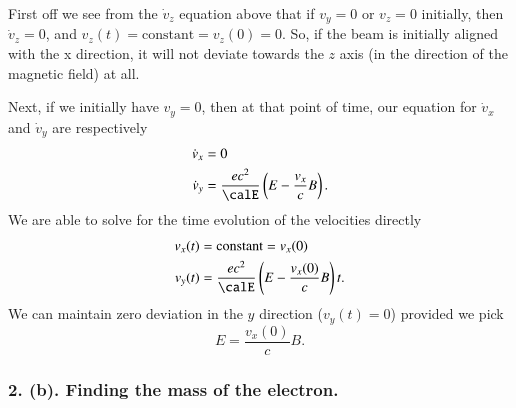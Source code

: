 {First off we see from the \(\dot{v}_z\) equation above that if \(v_y = 0\) or \(v_z = 0\) initially, then \(\dot{v}_z = 0\), and \(v_z(t) = \text{constant} = v_z(0) = 0\).  So, if the beam is initially aligned with the x direction, it will not deviate towards the \(z\) axis (in the direction of the magnetic field) at all.

Next, if we initially have \(v_y = 0\), then at that point of time, our equation for \(\dot{v}_x\) and \(\dot{v}_y\) are respectively
%
\begin{equation}\label{eqn:relElectroDynProblemSet2:370}
\begin{aligned}
\dot{v}_x &= 0 \\
\dot{v}_y &= \frac{e c^2}{\calE} \left( E - \frac{v_x}{c} B \right).
\end{aligned}
\end{equation}
%
We are able to solve for the time evolution of the velocities directly
%
\begin{equation}\label{eqn:relElectroDynProblemSet2:390}
\begin{aligned}
v_x(t) &= \text{constant} = v_x(0) \\
v_y(t) &= \frac{e c^2}{\calE} \left( E - \frac{v_x(0)}{c} B \right) t.
\end{aligned}
\end{equation}
%
We can maintain zero deviation in the \(y\) direction (\(v_y(t) = 0\)) provided we pick
%
\begin{equation}\label{eqn:relElectroDynProblemSet2:410}
E = \frac{v_x(0)}{c} B.
\end{equation}
%
\subsubsection{2. (b). Finding the mass of the electron.}

}
